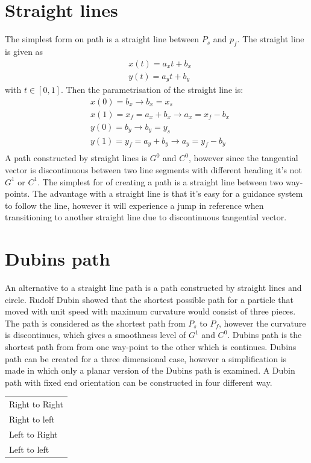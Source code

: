 \section{Straight lines}
The simplest form on path is a straight line between $P_s$ and $p_f$. The straight line is given as 
\begin{subequations}
\begin{align}
& x(t) = a_xt + b_x \\
& y(t) = a_yt + b_y 
\end{align}
\end{subequations}
with $ t \in [0,1] $. Then the parametrisation of the straight line is:
\begin{subequations}
\begin{align}
& x(0) = b_x \rightarrow b_x = x_s \\
& x(1) = x_f = a_x + b_x \rightarrow a_x = x_f - b_x \\
& y(0) = b_y \rightarrow b_y = y_s \\
& y(1) = y_f = a_y + b_y \rightarrow a_y = y_f - b_y \\
\end{align}
\end{subequations}
A path constructed by straight lines is $G^0$ and $C^0$, however since the tangential vector is discontinuous between two line segments with different heading it's not $G^1$ or $C^1$.
The simplest for of creating a path is a straight line between two way-points. The advantage with a straight line is that it's easy for a guidance system to follow the line, however it will experience a jump in reference when transitioning to another straight line due to discontinuous tangential vector.
\section{Dubins path}\label{S:DubinsPath}
An alternative to a straight line path is a path constructed by straight lines and circle. Rudolf Dubin showed \citep{dubins1957curves} that the shortest possible path for a particle that moved with unit speed with maximum curvature would consist of three pieces. The path is considered as the shortest path from $P_s$ to $P_f$, however the curvature is discontinues, which gives a smoothness level of $G^1$ and $C^0$. 
Dubins path is the shortest path from from one way-point to the other which is continues. Dubins path can be created for a three dimensional case, however a simplification is made in which only a planar version of the Dubins path is examined. A Dubin path with fixed end orientation can be constructed in four different way.
\begin{table}[H]
\centering
\begin{adjustbox}{max width=\textwidth}
\begin{tabular}{ | l |}
\hline
Right to Right \\
Right to left \\
Left to Right \\
Left to left \\ \hline
\end{tabular}
\end{adjustbox}
\end{table}

